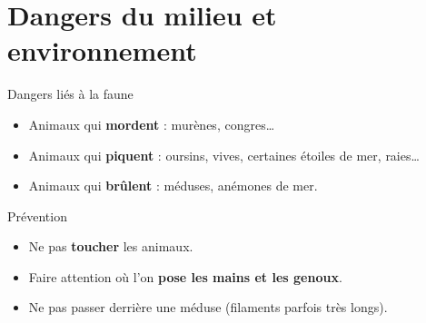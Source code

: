 \section{Dangers du milieu et environnement}

\begin{frame}{Dangers liés à la faune}
  \begin{itemize}
    \item Animaux qui \textbf{mordent} : murènes, congres…
    \item Animaux qui \textbf{piquent} : oursins, vives, certaines étoiles de mer, raies…
    \item Animaux qui \textbf{brûlent} : méduses, anémones de mer.
  \end{itemize}

  \begin{block}{Prévention}
    \begin{itemize}
      \item Ne pas \textbf{toucher} les animaux.
      \item Faire attention où l’on \textbf{pose les mains et les genoux}.
      \item Ne pas passer derrière une méduse (filaments parfois très longs).
    \end{itemize}
  \end{block}
\end{frame}

